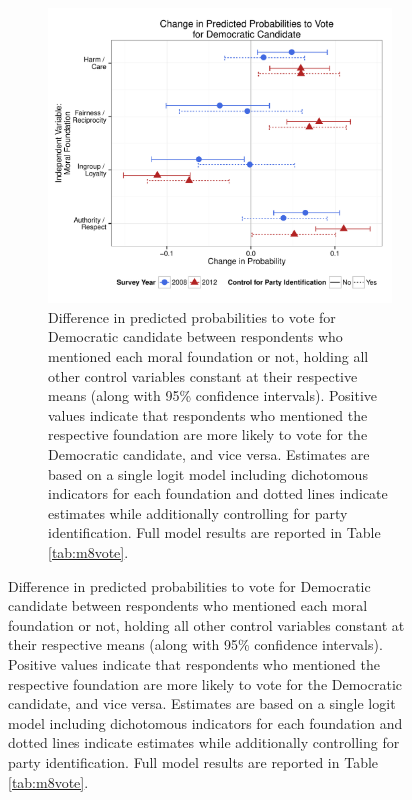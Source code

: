 \documentclass[12pt]{article}
\begin{document}
\begin{figure}[h]
\begin{subfigure}[t]{0.49\textwidth}
    \includegraphics[scale=.4]{../calc/fig/appD12vote.pdf}
    \caption{Difference in predicted probabilities to vote for Democratic candidate between respondents who mentioned each moral foundation or not, holding all other control variables constant at their respective means (along with 95\% confidence intervals). Positive values indicate that respondents who mentioned the respective foundation are more likely to vote for the Democratic candidate, and vice versa. Estimates are based on a single logit model including dichotomous indicators for each foundation and dotted lines indicate estimates while additionally controlling for party identification. Full model results are reported in Table \ref{tab:m8vote}.}\label{fig:appD12vote}
  \end{subfigure}
\end{figure}
\end{document}
